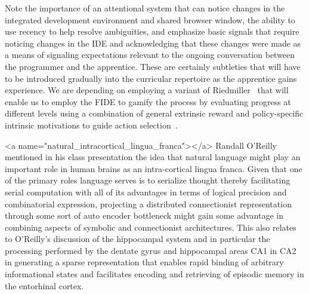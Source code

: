 Note the importance of an attentional system that can notice changes in the integrated development environment and shared browser window, the ability to use recency to help resolve ambiguities, and emphasize basic signals that require noticing changes in the IDE and acknowledging that these changes were made as a means of signaling expectations relevant to the ongoing conversation between the programmer and the apprentice. These are certainly subtleties that will have to be introduced gradually into the curricular repertoire as the apprentice gains experience. We are depending on employing a variant of Riedmiller~\etal{} that will enable us to employ the FIDE to gamify the process by evaluating progress at different levels using a combination of general extrinsic reward and policy-specific intrinsic motivations to guide action selection~\cite{RiedmilleretalCoRR-18}.

\rawhtml
<a name="natural_intracortical_lingua_franca"></a>
\endrawhtml
Randall O'Reilly mentioned in his class presentation the idea that natural language might play an important role in human brains as an intra-cortical lingua franca. Given that one of the primary roles language serves is to serialize thought thereby facilitating serial computation with all of its advantages in terms of logical precision and combinatorial expression, projecting a distributed connectionist representation through some sort of auto encoder bottleneck might gain some advantage in combining aspects of symbolic and connectionist architectures. This also relates to O'Reilly’s discussion of the hippocampal system and in particular the processing performed by the dentate gyrus and hippocampal areas CA1 in CA2 in generating a sparse representation that enables rapid binding of arbitrary informational states and facilitates encoding and retrieving of episodic memory in the entorhinal cortex.

